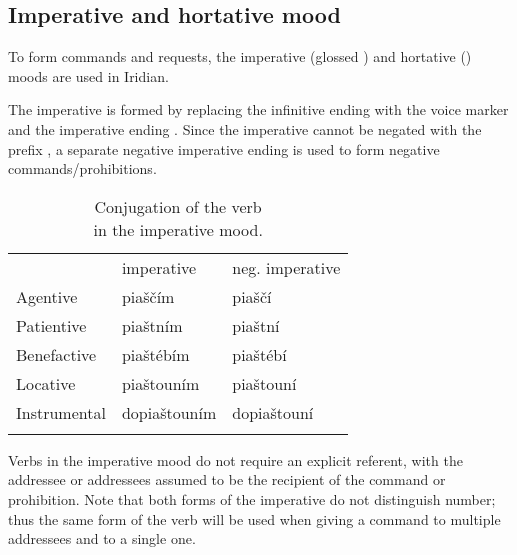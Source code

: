 \subsection{Imperative and hortative
mood}\label{sec:imp-hort}

To form commands and requests, the imperative
(glossed \Imp{}) and hortative () moods are used in Iridian.

The imperative is formed by replacing the infinitive ending  with the
voice marker and the imperative ending . Since the
imperative cannot be negated with the prefix ,
a separate negative imperative ending  is used to form negative
commands/prohibitions.

\begin{table}
\sffamily\footnotesize
	\caption{Conjugation of the verb \\ in the imperative mood.}
	\label{tbl:imperative}
\medskip
    \begin{tabu}to 0.7
         \toprule \addlinespace
         &{\sc imperative}&{\sc neg. imperative}  \\ \addlinespace
         \midrule \addlinespace

         Agentive &
         {piaščím} &
         {piaščí}\\ \addlinespace

         Patientive &
         {piaštním} &
         {piaštní}\\ \addlinespace

         Benefactive &
         {piaštébím} &
         {piaštébí}\\ \addlinespace

         Locative &
         {piaštouním} &
         {piaštouní}\\ \addlinespace

         Instrumental &
         {dopiaštouním} &
         {dopiaštouní}\\ \addlinespace

         \bottomrule
    \end{tabu}

\end{table}

Verbs in the imperative mood do not require an explicit referent, with the
addressee or addressees assumed to be the recipient of the command or
prohibition. Note that both forms of the imperative do not distinguish number;
thus the same form of the verb will be used when giving a command to multiple
addressees and to a single one.

